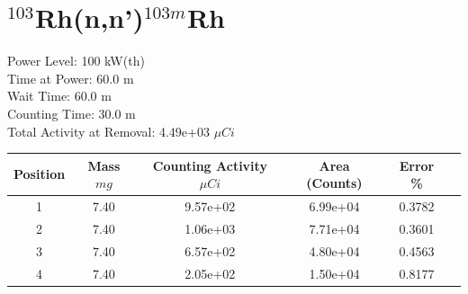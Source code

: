 \newpage

\section*{ $^{103}$Rh(n,n')$^{103m}$Rh }

Power Level: 100 kW(th) \\
Time at Power: 60.0 m \\
Wait Time: 60.0 m \\
Counting Time: 30.0 m \\
Total Activity at Removal: 4.49e+03 $\mu Ci$

\begin{table}[h]
\centering
\begin{tabular}{ |c|c|c|c|c|c| }
 \hline
 Position & Mass $mg$ & Counting Activity $\mu Ci$ & Area (Counts) & Error \% \\
 \hline 
 1 & 7.40 & 9.57e+02 & 6.99e+04 & 0.3782 \\ 
\hline
 2 & 7.40 & 1.06e+03 & 7.71e+04 & 0.3601 \\ 
\hline
 3 & 7.40 & 6.57e+02 & 4.80e+04 & 0.4563 \\ 
\hline
 4 & 7.40 & 2.05e+02 & 1.50e+04 & 0.8177 \\ 
\hline
\end{tabular}
\end{table}

